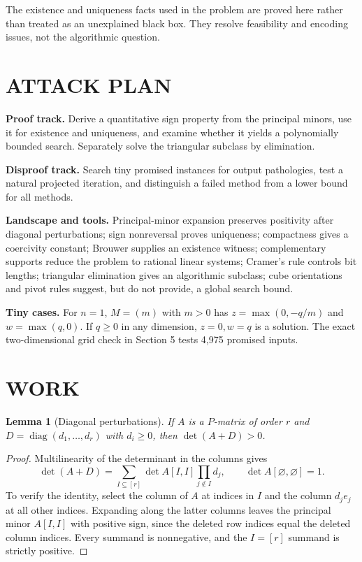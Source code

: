 \documentclass[11pt,a4paper]{article}
\newtheorem{lemma}[theorem]{Lemma}
\theoremstyle{definition}\newtheorem{definition}[theorem]{Definition}
\theoremstyle{remark}\newtheorem{remark}[theorem]{Remark}
\newcommand{\1}{\mathbf 1}
\begin{document}
The existence and uniqueness facts used in the problem are proved here rather than treated as an unexplained black box. They resolve feasibility and encoding issues, not the algorithmic question.

\section{ATTACK PLAN}
\textbf{Proof track.} Derive a quantitative sign property from the principal minors, use it for existence and uniqueness, and examine whether it yields a polynomially bounded search. Separately solve the triangular subclass by elimination.

\textbf{Disproof track.} Search tiny promised instances for output pathologies, test a natural projected iteration, and distinguish a failed method from a lower bound for all methods.

\textbf{Landscape and tools.} Principal-minor expansion preserves positivity after diagonal perturbations; sign nonreversal proves uniqueness; compactness gives a coercivity constant; Brouwer supplies an existence witness; complementary supports reduce the problem to rational linear systems; Cramer's rule controls bit lengths; triangular elimination gives an algorithmic subclass; cube orientations and pivot rules suggest, but do not provide, a global search bound.

\textbf{Tiny cases.} For $n=1$, $M=(m)$ with $m>0$ has $z=\max(0,-q/m)$ and $w=\max(q,0)$. If $q\ge0$ in any dimension, $z=0,w=q$ is a solution. The exact two-dimensional grid check in Section 5 tests 4,975 promised inputs.

\section{WORK}
\begin{lemma}[Diagonal perturbations]\label{lem:diag}
If $A$ is a $P$-matrix of order $r$ and $D=\operatorname{diag}(d_1,\ldots,d_r)$ with $d_i\ge0$, then $\det(A+D)>0$.
\end{lemma}
\begin{proof}
Multilinearity of the determinant in the columns gives
\[
 \det(A+D)=\sum_{I\subseteq[r]}\det A[I,I]\prod_{j\notin I}d_j,
 \qquad\det A[\varnothing,\varnothing]=1.
\]
To verify the identity, select the column of $A$ at indices in $I$ and the column $d_je_j$ at all other indices. Expanding along the latter columns leaves the principal minor $A[I,I]$ with positive sign, since the deleted row indices equal the deleted column indices. Every summand is nonnegative, and the $I=[r]$ summand is strictly positive.
\end{proof}
\end{document}
